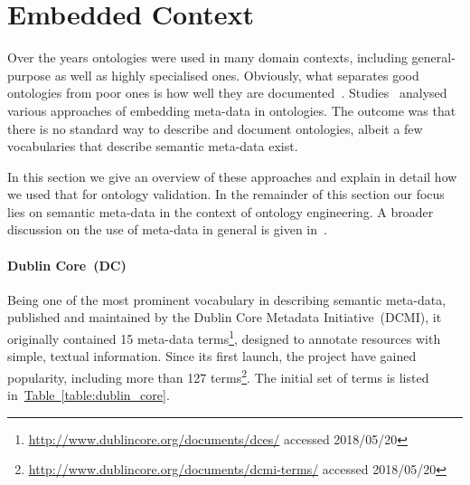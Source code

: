 \documentclass[draft,final]{vutinfth} %
\begin{document}
\section{Embedded Context}\label{sec:embedded_context}
Over the years ontologies were used in many domain contexts, including general-purpose as well as highly specialised ones. Obviously, what separates good ontologies from poor ones is how well they are documented~\cite{daquin2012}. Studies~\cite{dutta2017} analysed various approaches of embedding meta-data in ontologies. The outcome was that there is no standard way to describe and document ontologies, albeit a few vocabularies that describe semantic meta-data exist. 

In this section we give an overview of these approaches and explain in detail how we used that for ontology validation. In the remainder of this section our focus lies on semantic meta-data in the context of ontology engineering. A broader discussion on the use of meta-data in general is given in~\cite{nilsson2010}. 

\paragraph{Dublin Core~(DC)} Being one of the most prominent vocabulary in describing semantic meta-data, published and maintained by the Dublin Core Metadata Initiative~(DCMI), it originally contained 15 meta-data terms\footnote{\url{http://www.dublincore.org/documents/dces/} accessed 2018/05/20},  designed to annotate resources with simple, textual information. Since its first launch, the project have gained popularity, including more than 127 terms\footnote{\url{http://www.dublincore.org/documents/dcmi-terms/} accessed 2018/05/20}. The initial set of terms is listed in~\hyperref[table:dublin_core]{Table~\ref*{table:dublin_core}}. 
\end{document}
